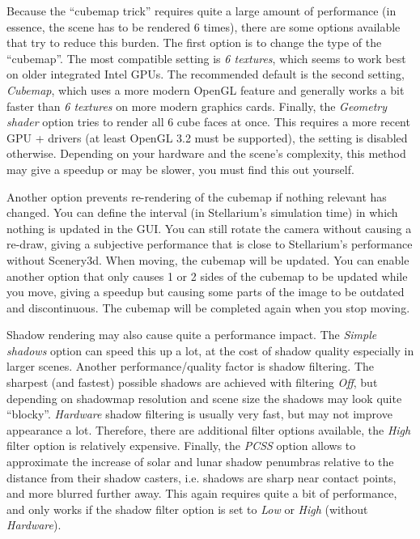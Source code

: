 Because the ``cubemap trick'' requires quite a large amount of performance (in
essence, the scene has to be rendered 6 times), there are some options available
that try to reduce this burden. The first option is to change the type of the
``cubemap''. The most compatible setting is \emph{6 textures}, which seems to
work best on older integrated Intel GPUs. The recommended default is the second
setting, \emph{Cubemap}, which uses a more modern OpenGL feature and generally
works a bit faster than \emph{6 textures} on more modern graphics cards. Finally,
the \emph{Geometry shader} option tries to render all 6 cube faces at once. This
requires a more recent GPU + drivers (at least OpenGL 3.2 must be supported),
the setting is disabled otherwise. Depending on your hardware and the scene's
complexity, this method may give a speedup or may be slower, you must find this out yourself.

Another option prevents re-rendering of the cubemap if nothing relevant has
changed. You can define the interval (in Stellarium's simulation time) in which
nothing is updated in the GUI. You can still rotate the camera without causing a
re-draw, giving a subjective performance that is close to Stellarium's
performance without Scenery3d. When moving, the cubemap will be updated. You can
enable another option that only causes 1 or 2 sides of the cubemap to be updated
while you move, giving a speedup but causing some parts of the image to be
outdated and discontinuous. The cubemap will be completed again when you stop
moving.

Shadow rendering may also cause quite a performance impact. The \emph{Simple
shadows} option can speed this up a lot, at the cost of shadow quality
especially in larger scenes. Another performance/quality factor is shadow
filtering. The sharpest (and fastest) possible shadows are achieved with
filtering \emph{Off}, but depending on shadowmap resolution and scene size the
shadows may look quite ``blocky''. \emph{Hardware} shadow filtering is usually
very fast, but may not improve appearance a lot. Therefore, there are additional
filter options available, the \emph{High} filter option is relatively expensive.
Finally, the \emph{PCSS} option allows to approximate the increase of solar and lunar shadow
penumbras relative to the distance from their shadow casters, i.e. shadows are
sharp near contact points, and more blurred further away. This again requires
quite a bit of performance, and only works if the shadow filter option is set to
\emph{Low} or \emph{High} (without \emph{Hardware}).

